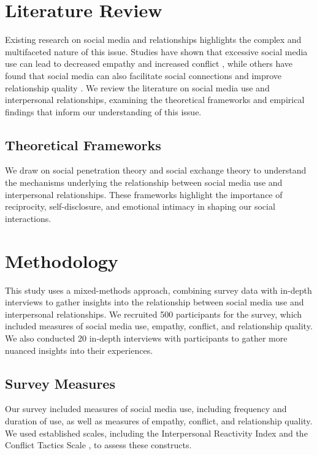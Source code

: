 \documentclass[12pt,a4paper]{article}
\begin{document}
\section{Literature Review}
Existing research on social media and relationships highlights the complex and multifaceted nature of this issue. Studies have shown that excessive social media use can lead to decreased empathy \citep{Király2019} and increased conflict \citep{Muise2013}, while others have found that social media can also facilitate social connections and improve relationship quality \citep{Best2014}. We review the literature on social media use and interpersonal relationships, examining the theoretical frameworks and empirical findings that inform our understanding of this issue.

\subsection{Theoretical Frameworks}
We draw on social penetration theory \citep{Altman1973} and social exchange theory \citep{Emerson1976} to understand the mechanisms underlying the relationship between social media use and interpersonal relationships. These frameworks highlight the importance of reciprocity, self-disclosure, and emotional intimacy in shaping our social interactions.

\section{Methodology}
This study uses a mixed-methods approach, combining survey data with in-depth interviews to gather insights into the relationship between social media use and interpersonal relationships. We recruited 500 participants for the survey, which included measures of social media use, empathy, conflict, and relationship quality. We also conducted 20 in-depth interviews with participants to gather more nuanced insights into their experiences.

\subsection{Survey Measures}
Our survey included measures of social media use, including frequency and duration of use, as well as measures of empathy, conflict, and relationship quality. We used established scales, including the Interpersonal Reactivity Index \citep{Davis1980} and the Conflict Tactics Scale \citep{Straus1979}, to assess these constructs.
\end{document}
